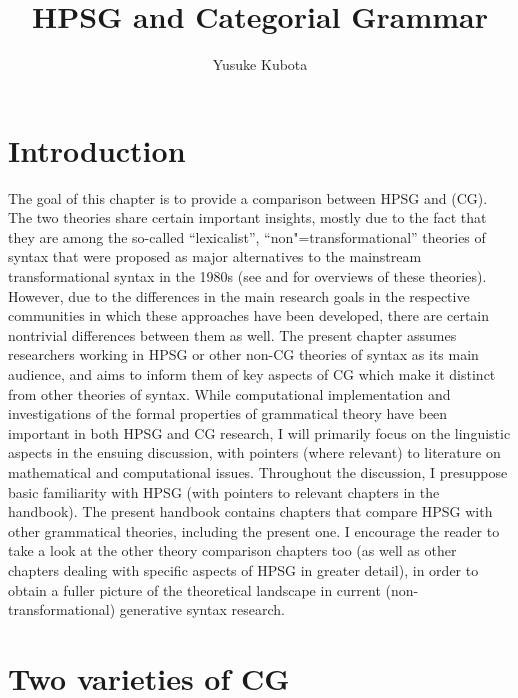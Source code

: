 \documentclass[output=paper
                ,modfonts
                ,nonflat
	        ,collection
	        ,collectionchapter
	        ,collectiontoclongg
 	        ,biblatex
                ,babelshorthands
                ,newtxmath
                ,draftmode
                ,colorlinks, citecolor=brown
]{./langsci/langscibook}
\author{Yusuke Kubota\affiliation{National Institute for Japanese Language and Linguistics}}
\title{HPSG and Categorial Grammar}
\begin{document}
\maketitle
\label{chap-cg}


\section{Introduction}

The goal of this chapter is to provide a comparison between HPSG and
 (CG). The two theories share certain important
insights, mostly due to the fact that they are among the so-called
``lexicalist'', ``non"=transformational'' theories of syntax that were
proposed as major alternatives to the mainstream transformational
syntax in the 1980s (see \citealt{BB2011a} and \citealt{MuellerGT-Eng3}
for overviews of these 
theories). However, due to the differences in the main research goals
in the respective communities in which these approaches have been
developed, there are certain nontrivial differences between them as
well. The present chapter assumes researchers working in HPSG or other
non-CG theories of syntax as its main audience, and aims to inform
them of key aspects of CG which make it distinct from other theories
of syntax. While computational implementation and investigations of the
formal properties of grammatical theory have been important in both
HPSG and CG research, I will primarily focus on the linguistic aspects
in the ensuing discussion, with pointers (where relevant) to literature on mathematical
and computational issues. Throughout the discussion, I presuppose
basic familiarity with HPSG (with pointers to relevant chapters in the
handbook). The present handbook contains chapters that compare HPSG
with other grammatical theories, including the present one. I
encourage the reader to take a look at the other theory comparison
chapters too (as well as other chapters dealing with specific
aspects of HPSG in greater detail), in order to obtain a fuller picture of the
theoretical landscape in current (non-transformational) generative
syntax research.


\section{Two varieties of CG \label{cgexposition}}
\end{document}
